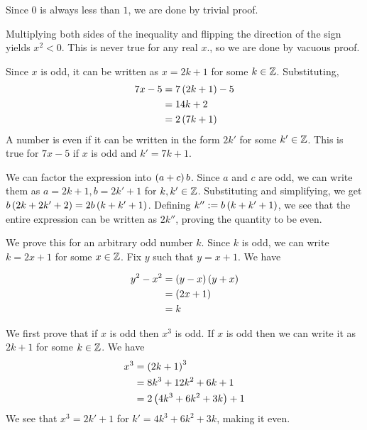 \documentclass{article}
\begin{document}
\problem


Since $0$ is always less than $1$, we are done by trivial proof.


Multiplying both sides of the inequality and flipping the direction of the sign yields $x^2 < 0$.
This is never true for any real $x$., so we are done by vacuous proof.

\problem{}

Since $x$ is odd, it can be written as $x = 2k+1$ for some $k \in \mathbb Z$.
Substituting,
\begin{align*}
  7x - 5 &= 7 \left (2k+1 \right) - 5 \\
         &= 14k + 2 \\
         &= 2 \left (7k + 1 \right)
\end{align*}
A number is even if it can be written in the form $2k'$ for some $k' \in \mathbb Z$.
This is true for $7x-5$ if $x$ is odd and $k' = 7k+1$.

We can factor the expression into $\left (a+c \right)b$.
Since $a$ and $c$ are odd, we can write them as $a = 2k+1, b = 2k' + 1$ for $k, k' \in \mathbb Z$.
Substituting and simplifying, we get $b\left (2k + 2k' + 2 \right) = 2b \left (k + k' + 1 \right)$.
Defining $k'' := b \left (k + k' + 1 \right)$, we see that the entire expression can be written as $2k''$, proving the quantity to be even.


We prove this for an arbitrary odd number $k$.
Since $k$ is odd, we can write $k = 2x+1$ for some $x \in \mathbb Z$.
Fix $y$ such that $y = x+1$.
We have

\begin{align*}
  y^2 - x^2 &= \left (y-x \right) \left (y+x \right) \\
            &= \left (2x+1 \right) \\
            &= k \\
\end{align*}

\problem
{}

We first prove that if $x$ is odd then $x^3$ is odd.
If $x$ is odd then we can write it as $2k+1$ for some $k \in \mathbb Z$.
We have
\begin{align*}
  x^3 &= \left (2k+1 \right)^3 \\
      &= 8k^3 + 12k^2 + 6k + 1 \\
      &= 2 \left (4k^3 + 6k^2 + 3k \right) + 1\\
\end{align*}
We see that $x^3 = 2k' + 1$ for $k' = 4k^3 + 6k^2 + 3k$, making it even.
\end{document}
